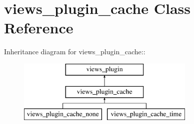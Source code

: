 \hypertarget{classviews__plugin__cache}{
\section{views\_\-plugin\_\-cache Class Reference}
\label{classviews__plugin__cache}
}
Inheritance diagram for views\_\-plugin\_\-cache::\begin{figure}[H]
\begin{center}
\leavevmode
\includegraphics[height=3cm]{classviews__plugin__cache}
\end{center}
\end{figure}
